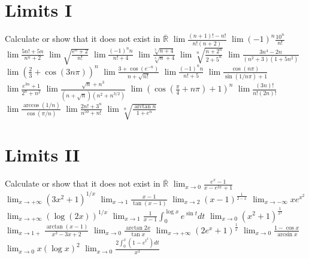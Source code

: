 \documentclass[12pt]{article}
\begin{document}
\section{Limits I}
\begin{ExerciseList}
	\Exercise Calculate or show that it does not exist in $\overline{\mathbb R}$
	\Question $\lim \frac{(n+1)!-n!}{n!(n+2)}$
	\Question $\lim (-1)^n \frac{10^n}{n!}$
	\Question $\lim \frac{5n!+5n}{n^n + 2}$
	\Question $\lim \sqrt{\frac{e^n+2}{n!}}$
	\Question $\lim \frac{(-1)^n n}{n!+4}$
	\Question $\lim \frac{\sqrt[3]{n+4}}{\sqrt[3]{n}+4}$
	\Question $\lim \sqrt[n]{\frac{n+2^n}{2+5^n}}$
	\Question $\lim \frac{3n^4-2n}{(n^2 + 3)(1+5n^2)}$
	\Question $\lim (\frac{2}{3}+\cos(3n\pi))^n$
	\Question $\lim \frac{3+\cos(e^{-n})}{n+\sqrt{n!}}$
	\Question $\lim \frac{(-1)^n n }{n! + 5}$
	\Question $\lim \frac{\cos{(n\pi)}}{\sin{(1/n\pi)}+1}$
	\Question $\lim \frac{e^{3n}+1}{2^n+n^2}$
	\Question $\lim \frac{\sqrt{n} + n^3}{(n+\sqrt{n})(n^2 + n^{3/2})}$
	\Question $\lim (\cos{(\frac{\pi}{4}+n\pi)}+1)^n$
	\Question $\lim \frac{(3n)!}{n!(2n)!}$
	\Question $\lim \frac{\arccos(1/n)}{\cos(\pi/n)}$
	\Question $\lim \frac{2n! + 3^n}{n^{50} + n!}$
	\Question $\lim \sqrt[n]{\frac{\arctan n}{1+e^n}}$
\end{ExerciseList}

\section{Limits II}
\begin{ExerciseList}
	\Exercise Calculate or show that it does not exist in $\overline{\mathbb R}$
	\Question $\lim_{x\to 0}\frac{e^x - 1}{x-e^{3x} + 1}$
	\Question $\lim_{x\to +\infty}(3x^2+1)^{1/x}$
	\Question $\lim_{x\to 1}\frac{x-1}{\tan(x-1)}$
	\Question $\lim_{x\to 2}(x-1)^{\frac{1}{2-x}}$
	\Question $\lim_{x\to -\infty}xe^{x^2}$
	\Question $\lim_{x\to +\infty}(\log(2x))^{1/x}$
	\Question $\lim_{x\to 1}\frac{1}{x-1}\int_0^{\log x}{e^{\sin t}}dt$
	\Question $\lim_{x\to 0}(x^2 + 1)^{\frac{1}{x^2}}$
	\Question $\lim_{x\to1+}\frac{\arctan(x-1)}{x^3-3x+2}$
	\Question $\lim_{x\to 0}\frac{\arctan{2x}}{\tan x}$
	\Question $\lim_{x\to +\infty}(2e^x + 1)^{\frac{1}{x}}$
	\Question $\lim_{x\to 0}\frac{1-\cos{x}}{\arcsin{x}}$
	\Question $\lim_{x\to 0} x(\log x)^2$
	\Question $\lim_{x\to 0}\frac{2\int_0^x(1-e^{t^2})dt}{x^2}$
\end{ExerciseList}
\end{document}
